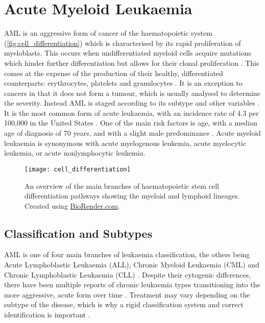 \clearpage
\section{Acute Myeloid Leukaemia}


\ac{AML} is an aggressive form of cancer of the haematopoietic system (\autoref{fig:cell_differentiation}) which is characterised by its rapid proliferation of myeloblasts. This occurs when undifferentiated myeloid cells acquire mutations which hinder further differentiation but allows for their clonal proliferation \citep{Khwaja2016}. This comes at the expense of the production of their healthy, differentiated counterparts: erythrocytes, platelets and granulocytes \citep{Khwaja2016}. It is an exception to cancers in that it does not form a tumour, which is usually analysed to determine the severity. Instead \ac{AML} is staged according to its subtype and other variables \citep{ACS2018}. It is the most common form of acute leukaemia, with an incidence rate of 4.3 per 100,000 in the United States \citep{Kouchkovsky2016}. One of the main risk factors is age, with a median age of diagnosis of 70 years, and with a slight male predominance \citep{juliusson2009age, Khwaja2016}. Acute myeloid leukaemia is synonymous with acute myelogenous leukemia, acute myelocytic leukemia, or acute nonlymphocytic leukemia.


\begin{figure}[!h]
    \centering
    \texttt{[image: cell\_differentiation]}
    \caption[Stem cell differentiation]{An overview of the main branches of haematopoietic stem cell differentiation pathways showing the myeloid and lymphoid lineages. Created using \href{https://biorender.com/}{BioRender.com}. } 
    \label{fig:cell_differentiation}
\end{figure}

\subsection{Classification and Subtypes}
\label{Classification and Subtypes}
\ac{AML} is one of four main branches of leukaemia classification, the others being Acute Lymphoblastic Leukaemia (ALL), Chronic Myeloid Leukaemia (CML) and Chronic Lymphoblastic Leukaemia (CLL) \citep{leukaemiabook}. Despite their cytogenic differences, there have been multiple reports of chronic leukaemia types transitioning into the more aggressive, acute form over time \citep{kaur2016rapid, frenkel1981acute, jacobs1984acute}. Treatment may vary depending on the subtype of the disease, which is why a rigid classification system and correct identification is important \citep{leukaemiabook}.

